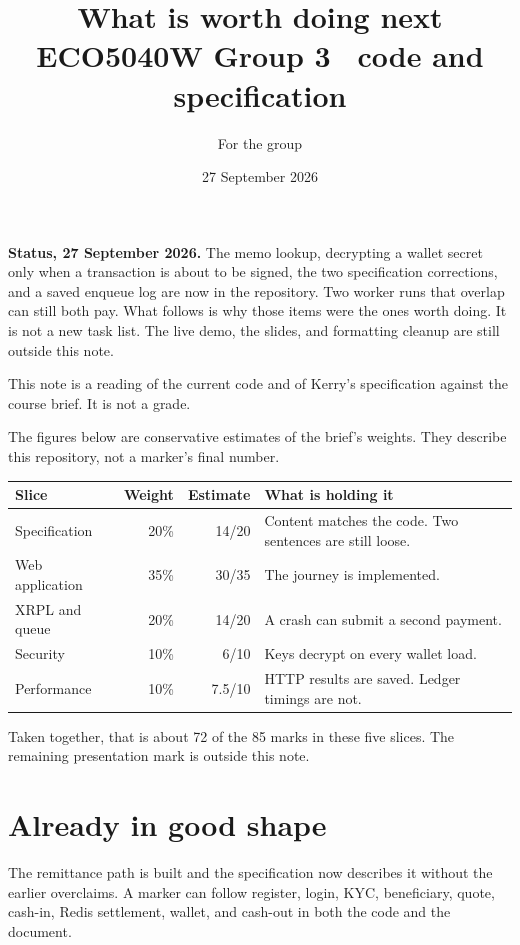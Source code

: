 \documentclass[11pt,a4paper]{article}
\title{\vspace{-1.2em}What is worth doing next\\[0.3em]
\large ECO5040W Group 3 \textbullet\ code and specification}
\author{For the group}
\date{27 September 2026}
\begin{document}
\maketitle
\vspace{-1.6em}

\noindent\textbf{Status, 27 September 2026.}
The memo lookup, decrypting a wallet secret only when a transaction is about to be signed, the two specification corrections, and a saved enqueue log are now in the repository.
Two worker runs that overlap can still both pay.
What follows is why those items were the ones worth doing.
It is not a new task list.
The live demo, the slides, and formatting cleanup are still outside this note.

This note is a reading of the current code and of Kerry's specification against the course brief. It is not a grade.

The figures below are conservative estimates of the brief's weights. They describe this repository, not a marker's final number.

\begin{center}
\begin{tabular}{@{}lrrl@{}}
\toprule
Slice & Weight & Estimate & What is holding it \\
\midrule
Specification & 20\% & 14/20 & Content matches the code. Two sentences are still loose. \\
Web application & 35\% & 30/35 & The journey is implemented. \\
XRPL and queue & 20\% & 14/20 & A crash can submit a second payment. \\
Security & 10\% & 6/10 & Keys decrypt on every wallet load. \\
Performance & 10\% & 7.5/10 & HTTP results are saved. Ledger timings are not. \\
\bottomrule
\end{tabular}
\end{center}

Taken together, that is about 72 of the 85 marks in these five slices. The remaining presentation mark is outside this note.

\section{Already in good shape}

The remittance path is built and the specification now describes it without the earlier overclaims. A marker can follow register, login, KYC, beneficiary, quote, cash-in, Redis settlement, wallet, and cash-out in both the code and the document.
\end{document}
